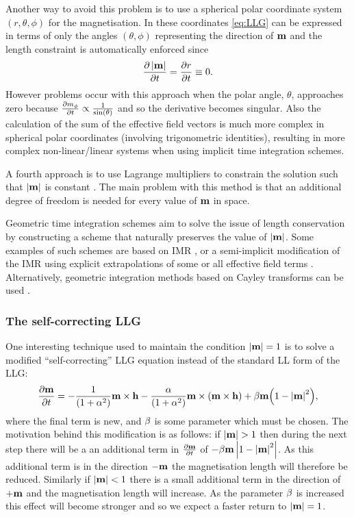 Another way to avoid this problem is to use a spherical polar coordinate system $(r,\theta,\phi)$ for the magnetisation.
In these coordinates \cref{eq:LLG} can be expressed in terms of only the angles $(\theta,\phi)$ representing the direction of $\boldsymbol{\mathrm{m}}$ and the length constraint is automatically enforced since
\begin{equation}
  \label{eq:40}
  \frac{\partial \left|{\boldsymbol{\mathrm{m}}} \right|}{\partial t} = \frac{\partial r}{\partial t} \equiv 0.
\end{equation}
However problems occur with this approach when the polar angle, $\theta$, approaches zero because $\frac{\partial m_{\phi}}{\partial t} \propto \frac{1}{\sin(\theta)}$ \cite{Fukushima2005} and so the derivative becomes singular.
Also the calculation of the sum of the effective field vectors is much more complex in spherical polar coordinates (involving trigonometric identities), resulting in more complex non-linear/linear systems when using implicit time integration schemes.

A fourth approach is to use Lagrange multipliers to constrain the solution such that $\left|{\boldsymbol{\mathrm{m}}} \right|$ is constant \cite{Szambolics2008a}.
The main problem with this method is that an additional degree of freedom is needed for every value of $\boldsymbol{\mathrm{m}}$ in space.

Geometric time integration schemes aim to solve the issue of length conservation by constructing a scheme that naturally preserves the value of $\left|{\boldsymbol{\mathrm{m}}} \right|$.
Some examples of such schemes are based on IMR \cite{DAquino2005}, or a semi-implicit modification of the IMR using explicit extrapolations of some or all effective field terms \cite{Spargo2003,Serpico2001,Mentink2010,Bottauscio2008}.
Alternatively, geometric integration methods based on Cayley transforms can be used \cite{Lewis2003,Bottauscio2011}.

\subsubsection{The self-correcting LLG}
\label{sec:sc-llg}

One interesting technique used to maintain the condition $\left|{\boldsymbol{\mathrm{m}}} \right| = 1$ is to solve a modified ``self-correcting'' LLG equation \cite{Porter2005} \cite{Fischbacher2009} instead of the standard LL form of the LLG:
\begin{equation}
  \label{eq:sc-ll}
  \frac{\partial \boldsymbol{\mathrm{m}}}{\partial t} = -\frac{1}{(1 + \alpha^2)}\boldsymbol{\mathrm{m}} \times \boldsymbol{\mathrm{h}}  -\frac{\alpha}{(1 + \alpha^2)} \boldsymbol{\mathrm{m}} \times {\left( \boldsymbol{\mathrm{m}}\times \boldsymbol{\mathrm{h}}\right)}
  + \beta \boldsymbol{\mathrm{m}} {\left( 1 - \left|{\boldsymbol{\mathrm{m}}} \right|^2 \right)},
\end{equation}
where the final term is new, and $\beta$ is some parameter which must be chosen.
The motivation behind this modification is as follows: if $\left|{\boldsymbol{\mathrm{m}}} \right| > 1$ then during the next step there will be a an additional term in $\frac{\partial \boldsymbol{\mathrm{m}}}{\partial t}$ of $-\beta \boldsymbol{\mathrm{m}} \left|{1 - \left|{\boldsymbol{\mathrm{m}}} \right|^2} \right|$.
As this additional term is in the direction $-\boldsymbol{\mathrm{m}}$ the magnetisation length will therefore be reduced.
Similarly if $\left|{\boldsymbol{\mathrm{m}}} \right| < 1$ there is a small additional term in the direction of $+\boldsymbol{\mathrm{m}}$ and the magnetisation length will increase.
As the parameter $\beta$ is increased this effect will become stronger and so we expect a faster return to $\left|{\boldsymbol{\mathrm{m}}} \right| = 1$.

